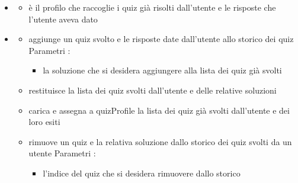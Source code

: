 \begin{itemize}
\item {}
\begin{itemize}
\item {}
\newline
è il profilo che raccoglie i quiz già risolti dall'utente e le risposte che l'utente aveva dato
\end{itemize}
\item {}
\begin{itemize}
\item {}
\newline
aggiunge un quiz svolto e le risposte date dall'utente allo storico dei quiz
\newline
Parametri :
\begin{itemize}
\item {}
\newline
la soluzione che si desidera aggiungere alla lista dei quiz già svolti
\end{itemize}
\item {}
\newline
restituisce la lista dei quiz svolti dall'utente e delle relative soluzioni
\newline
\item {}
\newline
carica e assegna a quizProfile la lista dei quiz già svolti dall'utente e dei loro esiti
\newline
\item {}
\newline
rimuove un quiz e la relativa soluzione dallo storico dei quiz svolti da un utente
\newline
Parametri :
\begin{itemize}
\item {}
\newline
l'indice del quiz che si desidera rimuovere dallo storico
\end{itemize}
\end{itemize}
\end{itemize}
